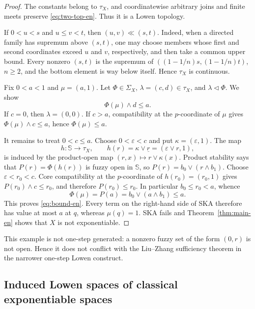 \documentclass[11pt,a4paper]{article}
\numberwithin{equation}{section}
\theoremstyle{definition}
\theoremstyle{remark}
\newcommand{\Sier}{\mathbb S}
\newcommand{\const}[1]{\underline{#1}}
\begin{document}
\begin{proof}
The constants belong to \(\tau_X\), and coordinatewise arbitrary joins
and finite meets preserve \eqref{eq:two-top-en}.  Thus it is a Lowen
topology.

If \(0<u<s\) and \(u\leq v<t\), then
\((u,v)\ll(s,t)\).  Indeed, when a directed family has supremum above
\((s,t)\), one may choose members whose first and second coordinates
exceed \(u\) and \(v\), respectively, and then take a common upper
bound.  Every nonzero \((s,t)\) is the supremum of
\(((1-1/n)s,(1-1/n)t)\), \(n\geq2\), and the bottom element is way below
itself.  Hence \(\tau_X\) is continuous.

Fix \(0<a<1\) and \(\mu=(a,1)\).  Let
\(\Phi\in\Sigma_X\), \(\lambda=(c,d)\in\tau_X\), and
\(\lambda\triangleleft\Phi\).  We show
\begin{equation}\label{eq:bound-en}
 \Phi(\mu)\wedge d\leq a.
\end{equation}
If \(c=0\), then \(\lambda=(0,0)\).  If \(c>a\), compatibility at the
\(p\)-coordinate of \(\mu\) gives
\(\Phi(\mu)\wedge c\leq a\), hence \(\Phi(\mu)\leq a\).

It remains to treat \(0<c\leq a\).  Choose
\(0<\varepsilon<c\) and put \(\kappa=(\varepsilon,1)\).  The map
\[
 h:\Sier\to\tau_X,\qquad
 h(r)=\kappa\vee\const r=(\varepsilon\vee r,1),
\]
is induced by the product-open map
\((r,x)\mapsto r\vee\kappa(x)\).  Product stability says that
\(P(r)=\Phi(h(r))\) is fuzzy open in \(\Sier\), so
\(P(r)=b_0\vee(r\wedge b_1)\).  Choose
\(\varepsilon<r_0<c\).  Core compatibility at the \(p\)-coordinate of
\(h(r_0)=(r_0,1)\) gives
\(P(r_0)\wedge c\leq r_0\), and therefore
\(P(r_0)\leq r_0\).  In particular \(b_0\leq r_0<a\), whence
\[
 \Phi(\mu)=P(a)=b_0\vee(a\wedge b_1)\leq a.
\]
This proves \eqref{eq:bound-en}.  Every term on the right-hand side of
SKA therefore has value at most \(a\) at \(q\), whereas \(\mu(q)=1\).
SKA fails and Theorem~\ref{thm:main-en} shows that \(X\) is not
exponentiable.
\end{proof}

This example is not one-step generated: a nonzero fuzzy set of the form
\((0,r)\) is not open.  Hence it does not conflict with the
Liu--Zhang sufficiency theorem in the narrower one-step Lowen construct.

\subsection{Induced Lowen spaces of classical exponentiable spaces}
\end{document}
